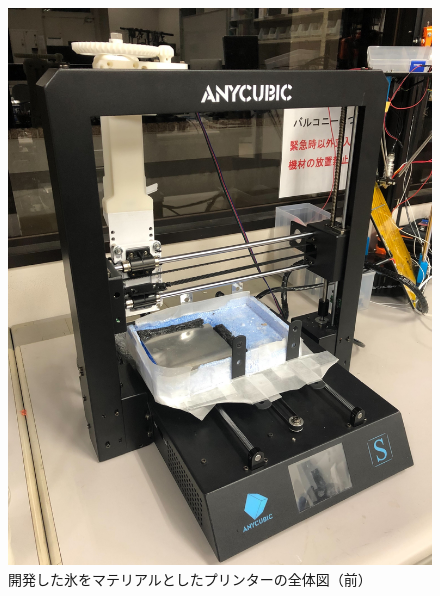 \begin{figure}[H]
  \centering
  \includegraphics[width=9truecm]{./fig/printer.jpg}
  \caption{開発した氷をマテリアルとしたプリンターの全体図（前）}
  \label{fig:printer}
\end{figure}


